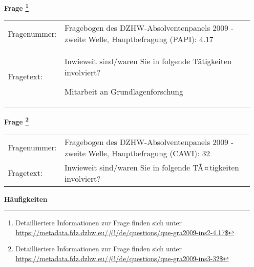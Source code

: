 				\vspace*{0.5cm}
                \noindent\textbf{Frage
	                \footnote{Detailliertere Informationen zur Frage finden sich unter
		              \url{https://metadata.fdz.dzhw.eu/\#!/de/questions/que-gra2009-ins2-4.17$}}}\\
				\begin{tabularx}{\hsize}{@{}lX}
					Fragenummer: &
					  Fragebogen des DZHW-Absolventenpanels 2009 - zweite Welle, Hauptbefragung (PAPI):
					  4.17
 \\
					Fragetext: & Inwieweit sind/waren Sie in folgende Tätigkeiten involviert?\par  Mitarbeit an Grundlagenforschung \\
				\end{tabularx}
				\vspace*{0.5cm}
                \noindent\textbf{Frage
	                \footnote{Detailliertere Informationen zur Frage finden sich unter
		              \url{https://metadata.fdz.dzhw.eu/\#!/de/questions/que-gra2009-ins3-32$}}}\\
				\begin{tabularx}{\hsize}{@{}lX}
					Fragenummer: &
					  Fragebogen des DZHW-Absolventenpanels 2009 - zweite Welle, Hauptbefragung (CAWI):
					  32
 \\
					Fragetext: & Inwieweit sind/waren Sie in folgende TÃ¤tigkeiten involviert? \\
				\end{tabularx}





        		\vspace*{0.5cm}
                \noindent\textbf{Häufigkeiten}

